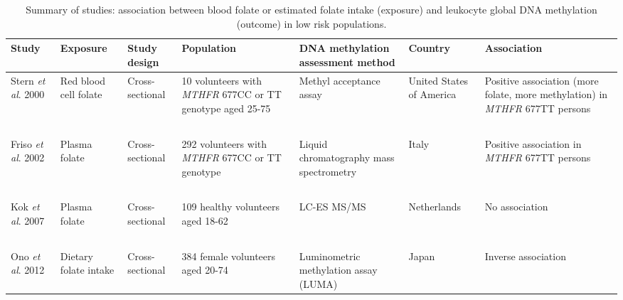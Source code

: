 \begin{center} 
\begin{sidewaystable}
\small
\caption{Summary of studies: association between blood folate or estimated folate intake (exposure) and leukocyte global DNA methylation (outcome) in low risk populations.} 
\label{table7_5}
\begin{tabular}{L{1.8cm}C{1.8cm}C{1.8cm}C{2.2cm}C{2.7cm}C{1.8cm}C{2.5cm}} 

\hline\bfseries Study & \bfseries Exposure & \bfseries Study design & \bfseries Population & \bfseries DNA methylation assessment method & \bfseries Country & \bfseries Association\\
\hline
Stern \textit{et al}. 2000 \cite{c712} &
Red blood cell folate &
Cross-sectional &
10 volunteers with \textit{MTHFR} 677CC or TT genotype aged 25-75 &
Methyl acceptance assay &
United States of America &
Positive association (more folate, more methylation) in \textit{MTHFR} 677TT persons\\
~ & ~ & ~ & ~ & ~ & ~ & ~\\
Friso \textit{et al}. 2002 \cite{c76} &
Plasma folate &
Cross-sectional &
292 volunteers with \textit{MTHFR} 
677CC or TT genotype &
Liquid chromatography mass spectrometry &
Italy &
Positive association in \textit{MTHFR} 677TT persons\\
~ & ~ & ~ & ~ & ~ & ~ & ~\\
Kok \textit{et al}. 2007 \cite{c78} &
Plasma folate &
Cross-sectional &
{ 109 healthy volunteers} aged 18-62 &
LC-ES MS/MS &
Netherlands &
No association\\
~ & ~ & ~ & ~ & ~ & ~ & ~\\
Ono \textit{et al}. 2012 \cite{c710} &
Dietary folate intake &
Cross-sectional &
384 female volunteers aged 20-74 &
Luminometric methylation assay (LUMA) &
Japan & Inverse association\\
\end{tabular}
\end{sidewaystable}
\end{center}

